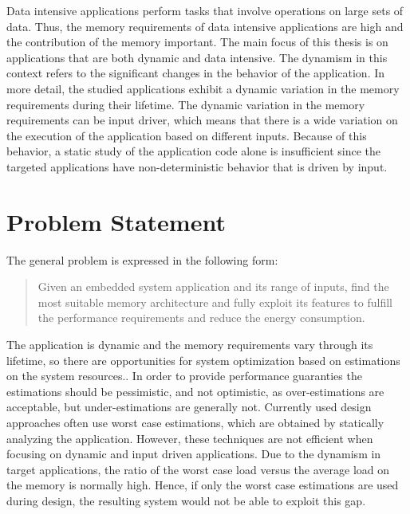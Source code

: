 Data intensive applications perform tasks that involve operations on large sets of data.
Thus, the memory requirements of data intensive applications are high and the contribution of the memory important.
The main focus of this thesis is on applications that are both dynamic and data intensive.
The dynamism in this context refers to the significant changes in the behavior of the application.
In more detail, the studied applications exhibit a dynamic variation in the memory requirements during their lifetime.
The dynamic variation in the memory requirements can be input driver, which means that there is a wide variation on the execution of the application based on different inputs.
Because of this behavior, a static study of the application code alone is insufficient since the targeted applications have non-deterministic behavior that is driven by input.

\section{Problem Statement}

The general problem is expressed in the following form:
\begin{quote}
Given an embedded system application and its range of inputs, find the most suitable memory architecture and fully exploit its features to fulfill the performance requirements and reduce the energy consumption. 
\end{quote} 

The application is dynamic and the memory requirements vary through its lifetime, so there are opportunities for system optimization based on estimations on the system resources..
In order to provide performance guaranties the estimations should be pessimistic, and not optimistic, as over-estimations are acceptable, but under-estimations are generally not.
Currently used design approaches often use worst case estimations, which are obtained by statically analyzing the application. 
However, these techniques are not efficient when focusing on dynamic and input driven applications.
Due to the dynamism in target applications, the ratio of the worst case load versus the average load on the memory is normally high.
Hence, if only the worst case estimations are used during design, the resulting system would not be able to exploit this gap. 

